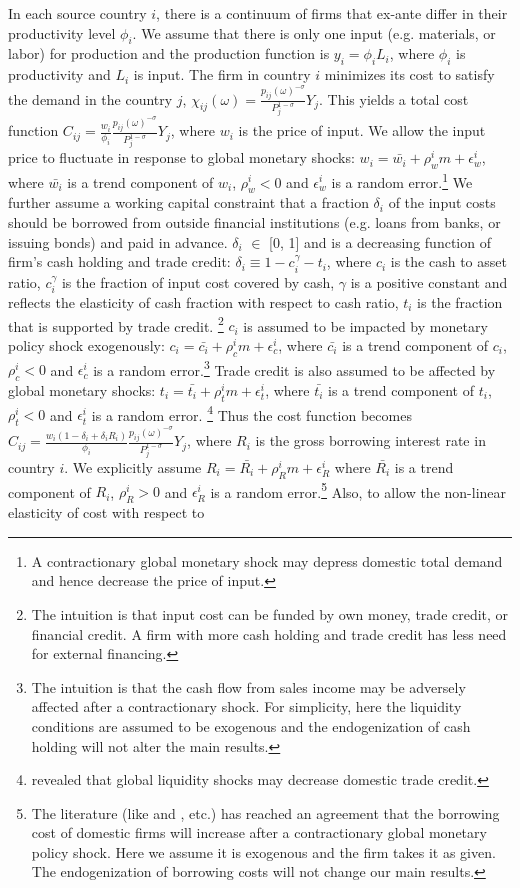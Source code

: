 \documentclass[12pt]{article}
\begin{document}
In each source country $i$, there is a continuum of firms that ex-ante differ in their productivity level $\phi_i$. We assume that there is only one input (e.g. materials, or labor) for production and the production function is $ y_i= \phi_i L_i$, where $\phi_i$ is productivity and $L_i$ is input. The firm in country $i$ minimizes its cost to satisfy the demand in the country $j$, $\chi_{ij}(\omega)=\frac{p_{ij}(\omega)^{-\sigma}}{P_j^{1-\sigma}} Y_j$. This yields a total cost function $ C_{ij}=\frac{w_i}{\phi_i} \frac{p_{ij}(\omega)^{-\sigma}}{P_j^{1-\sigma}} Y_j$, where $w_i$ is the price of input. We allow the input price to fluctuate in response to global monetary shocks: $w_i=\bar{w_i}+\rho_w^i m + \epsilon_w^i$, where $\bar{w_i}$ is a trend component of $w_i$, $\rho_w^i<0$ and $\epsilon_w^i$ is a random error.\footnote{A contractionary global monetary shock may depress domestic total demand and hence decrease the price of input.} We further assume a working capital constraint that a fraction $\delta_i$ of the input costs should be borrowed from outside financial institutions (e.g. loans from banks, or issuing bonds) and paid in advance. $\delta_i$ $\in$ [0, 1] and is a decreasing function of firm's cash holding and trade credit: $\delta_i \equiv 1-c_i^\gamma-t_i$, where $c_i$ is the cash to asset ratio, $c_i^\gamma$ is the fraction of input cost covered by cash, $\gamma$ is a positive constant and reflects the elasticity of cash fraction with respect to cash ratio, $t_i$ is the fraction that is supported by trade credit. \footnote{The intuition is that input cost can be funded by own money, trade credit, or financial credit. A firm with more cash holding and trade credit has less need for external financing.} $c_i$ is assumed to be impacted by monetary policy shock exogenously: $c_i=\bar{c_i}+\rho_c^i m+\epsilon_c^i$, where $\bar{c_i}$ is a trend component of $c_i$, $\rho_c^i<0$ and $\epsilon_c^i$ is a random error.\footnote{The intuition is that the cash flow from sales income may be adversely affected after a contractionary shock. For simplicity, here the liquidity conditions are assumed to be exogenous and the endogenization of cash holding will not alter the main results.} Trade credit is also assumed to be affected by global monetary shocks: $t_i=\bar{t_i}+\rho_t^i m+\epsilon_t^i$, where $\bar{t_i}$ is a trend component of $t_i$, $\rho_t^i<0$ and $\epsilon_t^i$ is a random error. \footnote{\cite{lin2018foreign} revealed that global liquidity shocks may decrease domestic trade credit.} Thus the cost function becomes $ C_{ij}=\frac{w_i(1-\delta_i+\delta_i R_i)}{\phi_i} \frac{p_{ij}(\omega)^{-\sigma}}{P_j^{1-\sigma}} Y_j$, where $R_i$ is the gross borrowing interest rate in country $i$. We explicitly assume $R_i=\bar{R_i}+\rho_R^i m+\epsilon_R^i$ where $\bar{R_i}$ is a trend component of $R_i$, $\rho_R^i>0$ and $\epsilon_R^i$ is a random error.\footnote{The literature (like \cite{georgiadis2016determinants} and \cite{miranda2020us}, etc.) has reached an agreement that the borrowing cost of domestic firms will increase after a contractionary global monetary policy shock. Here we assume it is exogenous and the firm takes it as given. The endogenization of borrowing costs will not change our main results.} Also, to allow the non-linear elasticity of cost with respect to 
\end{document}
